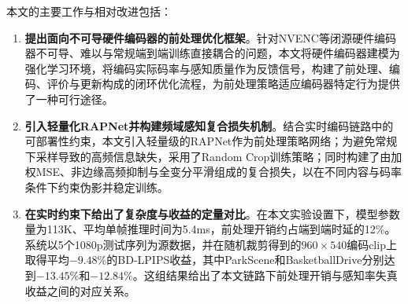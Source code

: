 
本文的主要工作与相对改进包括：

\begin{enumerate}
  \item \textbf{提出面向不可导硬件编码器的前处理优化框架}。针对NVENC等闭源硬件编码器不可导、难以与常规端到端训练直接耦合的问题，本文将硬件编码器建模为强化学习环境，将编码实际码率与感知质量作为反馈信号，构建了前处理、编码、评价与更新构成的闭环优化流程，为前处理策略适应编码器特定行为提供了一种可行途径。

  \item \textbf{引入轻量化RAPNet并构建频域感知复合损失机制}。结合实时编码链路中的可部署性约束，本文引入轻量级的RAPNet\cite{ref27-zhao2025rapnet}作为前处理策略网络；为避免常规下采样导致的高频信息缺失，采用了Random Crop训练策略；同时构建了由加权MSE、非边缘高频抑制与全变分平滑组成的复合损失，以在不同内容与码率条件下约束伪影并稳定训练。

  \item \textbf{在实时约束下给出了复杂度与收益的定量对比}。在本文实验设置下，模型参数量为113K、平均单帧推理时间为5.4ms，前处理开销约占端到端时延的12\%。系统以5个1080p测试序列为源数据，并在随机裁剪得到的$960\times540$编码clip上取得平均$-9.48\%$的BD-LPIPS收益，其中ParkScene和BasketballDrive分别达到$-13.45\%$和$-12.84\%$。这组结果给出了本文链路下前处理开销与感知率失真收益之间的对应关系。
\end{enumerate}
